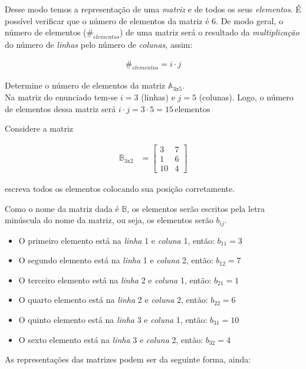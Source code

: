 Desse modo temos a representação de uma \textit{matriz} e de todos os seus \textit{elementos}. É possível verificar que o número de
elementos da matriz é 6. De modo geral, o número de elementos ($\#_{elementos}$) de uma matriz será o resultado da \textit{multiplicação} do número de \textit{linhas} pelo número de \textit{colunas}, assim:

\begin{ceqn}
	\begin{align*}
	\#_{elementos}=i\cdot j
	\end{align*}
\end{ceqn}

\begin{example}
Determine o número de elementos da matriz $\mathbb{A}_{3\mathrm{x}5} $.\\
Na matriz do enunciado tem-se $i=3$ (linhas) e $j=5$ (colunas).
Logo, o número de elementos dessa matriz será $i \cdot j = 3 \cdot 5 = 15\, \mathrm{elementos}$
\end{example}


\begin{example}
	Considere a matriz
	
	\begin{align*}
	\mathbb{B}_{3\mathrm{x}2} & =\begin{bmatrix}3 & 7\\
	1 & 6\\
	10 & 4
	\end{bmatrix}
	\end{align*}
	
	escreva todos os elementos colocando sua posição corretamente.

	Como o nome da matriz dada é $\mathbb{B}$, os elementos serão escritos pela letra minúscula do nome da matriz, ou seja, os elementos serão
	$b_{i j}$.
\begin{itemize}
	\item O primeiro elemento está na \textit{linha} 1 e \textit{coluna} 1,
	então: $b_{1 1} = 3$
	\item O segundo elemento está na \textit{linha} 1 e \textit{coluna} 2,
	então: $b_{1 2} = 7$
	\item O terceiro elemento está na \textit{linha} 2 e \textit{coluna} 1,
	então: $b_{2 1} = 1$
	\item O quarto elemento está na \textit{linha} 2 e \textit{coluna} 2,
	então: $b_{2 2} = 6$
	\item O quinto elemento está na \textit{linha} 3 e \textit{coluna} 1,
	então: $b_{3 1} = 10$
	\item O sexto elemento está na \textit{linha} 3 e \textit{coluna} 2, então:
	$b_{3 2} = 4$
\end{itemize}
\end{example}
As representações das matrizes podem ser da seguinte forma, ainda:

